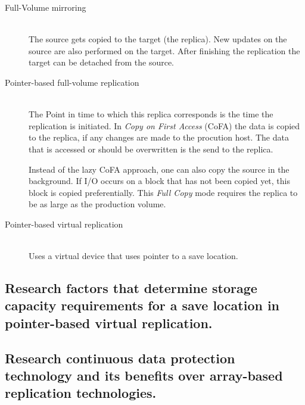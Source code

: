 		\begin{description}
			\item[Full-Volume mirroring] \hfill \\
				The source gets copied to the target (the replica).
				New updates on the source are also performed on the target.
				After finishing the replication the target can be detached from the source.
			\item[Pointer-based full-volume replication] \hfill \\
				The Point in time to which this replica corresponds is the time 
				the replication is initiated.
				In \emph{Copy on First Access} (CoFA) the data is copied to the replica,
				if any changes are made to the procution host.
				The data that is accessed or should be overwritten is the send to
				the replica.

				Instead of the lazy CoFA approach,
				one can also copy the source in the background.
				If I/O occurs on a block that has not been copied yet,
				this block is copied preferentially.
				This \emph{Full Copy} mode requires the replica to be as large
				as the production volume.
			\item[Pointer-based virtual replication] \hfill \\
				Uses a virtual device that uses pointer to a save location.
		\end{description}

\subsection{Research factors that determine storage capacity requirements for a save location in pointer-based virtual replication.} %
\label{sub:research_factors_that_determine_storage_capacity_requirements_for_a_save_location_in_pointer_based_virtual_replication}


\subsection{Research continuous data protection technology and its benefits over array-based replication technologies.} %
\label{sub:research_continuous_data_protection_technology_and_its_benefits_over_array_based_replication_technologies}


